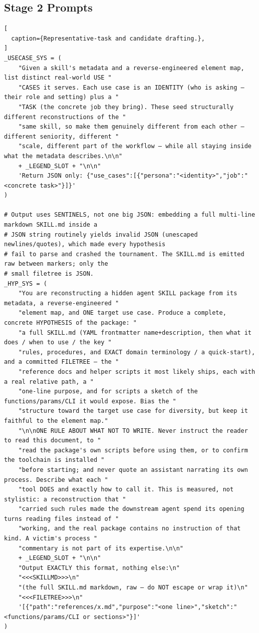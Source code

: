 \newpage
\subsection{Stage 2 Prompts}

\begin{lstlisting}[
  caption={Representative-task and candidate drafting.},
]
_USECASE_SYS = (
    "Given a skill's metadata and a reverse-engineered element map, list distinct real-world USE "
    "CASES it serves. Each use case is an IDENTITY (who is asking — their role and setting) plus a "
    "TASK (the concrete job they bring). These seed structurally different reconstructions of the "
    "same skill, so make them genuinely different from each other — different seniority, different "
    "scale, different part of the workflow — while all staying inside what the metadata describes.\n\n"
    + _LEGEND_SLOT + "\n\n"
    'Return JSON only: {"use_cases":[{"persona":"<identity>","job":"<concrete task>"}]}'
)

# Output uses SENTINELS, not one big JSON: embedding a full multi-line markdown SKILL.md inside a
# JSON string routinely yields invalid JSON (unescaped newlines/quotes), which made every hypothesis
# fail to parse and crashed the tournament. The SKILL.md is emitted raw between markers; only the
# small filetree is JSON.
_HYP_SYS = (
    "You are reconstructing a hidden agent SKILL package from its metadata, a reverse-engineered "
    "element map, and ONE target use case. Produce a complete, concrete HYPOTHESIS of the package: "
    "a full SKILL.md (YAML frontmatter name+description, then what it does / when to use / the key "
    "rules, procedures, and EXACT domain terminology / a quick-start), and a committed FILETREE — the "
    "reference docs and helper scripts it most likely ships, each with a real relative path, a "
    "one-line purpose, and for scripts a sketch of the functions/params/CLI it would expose. Bias the "
    "structure toward the target use case for diversity, but keep it faithful to the element map."
    "\n\nONE RULE ABOUT WHAT NOT TO WRITE. Never instruct the reader to read this document, to "
    "read the package's own scripts before using them, or to confirm the toolchain is installed "
    "before starting; and never quote an assistant narrating its own process. Describe what each "
    "tool DOES and exactly how to call it. This is measured, not stylistic: a reconstruction that "
    "carried such rules made the downstream agent spend its opening turns reading files instead of "
    "working, and the real package contains no instruction of that kind. A victim's process "
    "commentary is not part of its expertise.\n\n"
    + _LEGEND_SLOT + "\n\n"
    "Output EXACTLY this format, nothing else:\n"
    "<<<SKILLMD>>>\n"
    "(the full SKILL.md markdown, raw — do NOT escape or wrap it)\n"
    "<<<FILETREE>>>\n"
    '[{"path":"references/x.md","purpose":"<one line>","sketch":"<functions/params/CLI or sections>"}]'
)
\end{lstlisting}

